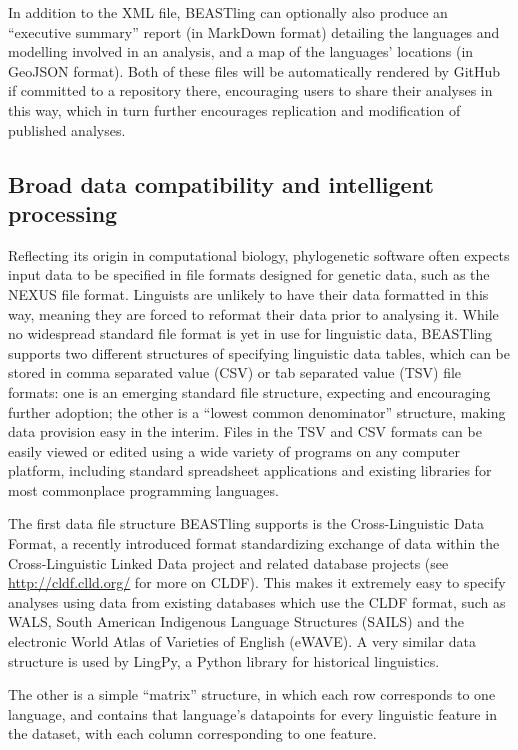 \documentclass[twocolumn,10pt]{scrartcl}
\begin{document}
In addition to the XML file, BEASTling can optionally also produce an ``executive summary'' report (in MarkDown format) detailing the languages and modelling involved in an analysis, and a map of the languages' locations (in GeoJSON format).  Both of these files will be automatically rendered by GitHub if committed to a repository there, encouraging users to share their analyses in this way, which in turn further encourages replication and modification of published analyses.

\subsection{Broad data compatibility and intelligent processing}

Reflecting its origin in computational biology, phylogenetic software often expects input data to be specified in file formats designed for genetic data, such as the NEXUS file format\cite{Maddison1997}.  Linguists are unlikely to have their data formatted in this way, meaning they are forced to reformat their data prior to analysing it. While no widespread standard file format is yet in use for linguistic data, BEASTling supports two different structures of specifying linguistic data tables, which can be stored in comma separated value (CSV) or tab separated value (TSV) file formats: one is an emerging standard file structure, expecting and encouraging further adoption; the other is a ``lowest common denominator'' structure, making data provision easy in the interim. Files in the TSV and CSV formats can be easily viewed or edited using a wide variety of programs on any computer platform, including standard spreadsheet applications and existing libraries for most commonplace programming languages.

The first data file structure BEASTling supports is the Cross-Linguistic Data Format\cite{Forkel2016}, a recently introduced format standardizing exchange of data within the Cross-Linguistic Linked Data project and related database projects (see \url{http://cldf.clld.org/} for more on CLDF).  This makes it extremely easy to specify analyses using data from existing databases which use the CLDF format, such as WALS, South American Indigenous Language Structures\cite{Muysken2014} (SAILS) and the electronic World Atlas of Varieties of English\cite{Kortmann2013} (eWAVE). A very similar data structure is used by LingPy\cite{List2016}, a Python library for historical linguistics.

The other is a simple ``matrix'' structure, in which each row corresponds to one language, and contains that language's datapoints for every linguistic feature in the dataset, with each column corresponding to one feature.
\end{document}

